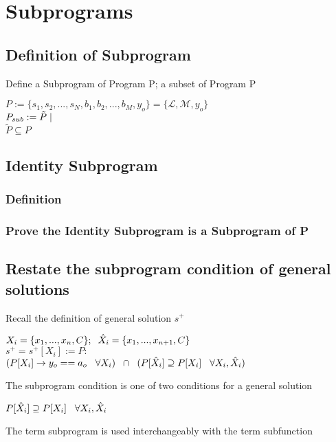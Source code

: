 \documentclass[11pt]{article}
\begin{document}
\newpage
\section{Subprograms}



\subsection{Definition of Subprogram}
Define a Subprogram of Program P; a subset of Program P
\begin{center}
$
P := \{s_1,s_2,...,s_N,b_1,b_2,...,b_M,y_o\} = \{\mathcal{L},\mathcal{M},y_o\}
$
\\ \vspace{2mm}
$
P_{sub} := \tilde{P} \hspace{1mm} |
$
\\ \vspace{2mm}
$
\tilde{P} \subseteq P
$
\end{center}

\subsection{Identity Subprogram}
\subsubsection{Definition}
\subsubsection{Prove the Identity Subprogram is a Subprogram of P}


\subsection{Restate the subprogram condition of general solutions}
Recall the definition of general solution $s^+$
\begin{center}
$
X_i = \{x_1,...,x_n,C\}; \hspace{2mm} \hat{X}_i = \{x_1,...,x_{n+1},C\}
$
\\ \vspace{2mm}
$
s^+ = s^+[X_i] := P :
$
\\ \vspace{2mm}
$
(P \lbrack X_i \rbrack \rightarrow y_{o} == a_{o} \hspace{3mm} \forall X_i) \hspace{2mm} \cap \hspace{2mm} (P[\hat{X}_i] \supseteq P[X_i] \hspace{3mm} \forall X_i,\hat{X}_i)
$
\end{center}
\vspace{3mm}
The subprogram condition is one of two conditions for a general solution
\begin{center}
$
P[\hat{X}_i] \supseteq P[X_i] \hspace{3mm} \forall X_i,\hat{X}_i
$
\end{center}
The term subprogram is used interchangeably with the term subfunction
\end{document}
